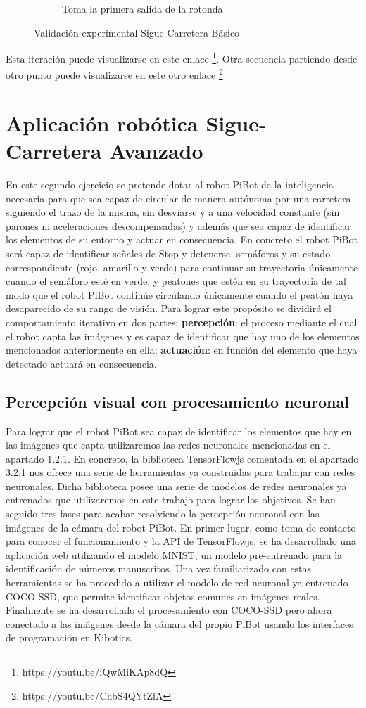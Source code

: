 \documentclass{report}
\begin{document}
\begin{figure}[h]
\begin{subfigure}{.5\textwidth}
  \caption{Toma la primera salida de la rotonda}
  \label{fig:sub-third}
\end{subfigure}
\caption{Validación experimental Sigue-Carretera Básico}
\label{fig:fig}
\end{figure}

Esta iteración puede visualizarse en este enlace \footnote{https://youtu.be/iQwMiKAp8dQ}. Otra secuencia partiendo desde otro punto puede visualizarse en este otro enlace \footnote{https://youtu.be/ChbS4QYtZiA}

\newpage
\section{Aplicación robótica Sigue-Carretera Avanzado}
En este segundo ejercicio se pretende dotar al robot PiBot de la inteligencia necesaria para que sea capaz de circular de manera autónoma por una carretera siguiendo el trazo de la misma, sin desviarse y a una velocidad constante (sin parones ni aceleraciones descompensadas) y además que sea capaz de identificar los elementos de su entorno y actuar en consecuencia. En concreto el robot PiBot será capaz de identificar señales de Stop y detenerse, semáforos y su estado correspondiente (rojo, amarillo y verde) para continuar su trayectoria únicamente cuando el semáforo esté en verde, y peatones que estén en su trayectoria de tal modo que el robot PiBot continúe circulando únicamente cuando el peatón haya desaparecido de su rango de visión. Para lograr este propósito se dividirá el comportamiento iterativo en dos partes; \textbf{percepción}: el proceso mediante el cual el robot capta las imágenes y es capaz de identificar que hay uno de los elementos mencionados anteriormente en ella; \textbf{actuación}: en función del elemento que haya detectado actuará en consecuencia.


\subsection{Percepción visual con procesamiento neuronal}
Para lograr que el robot PiBot sea capaz de identificar los elementos que hay en las imágenes que capta utilizaremos las redes neuronales mencionadas en el apartado 1.2.1. En concreto, la biblioteca TensorFlowjs comentada en el apartado 3.2.1 nos ofrece una serie de herramientas ya construidas para trabajar con redes neuronales. Dicha biblioteca posee una serie de modelos de redes neuronales ya entrenados que utilizaremos en este trabajo para lograr los objetivos. Se han seguido tres fases para acabar resolviendo la percepción neuronal con las imágenes de la cámara del robot PiBot. En primer lugar, como toma de contacto para conocer el funcionamiento y la API de TensorFlowjs, se ha desarrollado una aplicación web utilizando el modelo MNIST, un modelo pre-entrenado para la identificación de números manuscritos. Una vez familiarizado con estas herramientas se ha procedido a utilizar el modelo de red neuronal ya entrenado COCO-SSD, que permite identificar objetos comunes en imágenes reales. Finalmente se ha desarrollado el procesamiento con COCO-SSD pero ahora conectado a las imágenes desde la cámara del propio PiBot usando los interfaces de programación en Kibotics.
\end{document}
